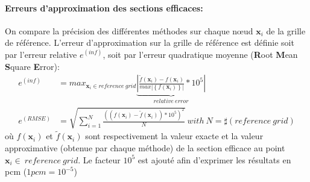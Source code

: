 \paragraph{Erreurs d'approximation des sections efficaces:\\}
\hspace{0.5cm} On compare la précision des différentes méthodes sur chaque nœud $\textbf{x}_i$ de la grille de référence.
L'erreur d'approximation sur la grille de référence est définie soit par l'erreur relative $e^{(inf)}$,
soit par l'erreur quadratique moyenne (\textbf{R}oot \textbf{M}ean \textbf{S}quare \textbf{E}rror):
\begin{align}
		e^{(inf)} & = max_{\textbf{x}_i \in reference\ grid} \underbrace{ \left | \frac{\tilde{f}(\textbf{x}_i) - f(\textbf{x}_i)}{ max \left | \left \{ f(\textbf{x}_i) \right \} \right |} * 10^5 \right | }_{relative\ error} \\
		e^{(RMSE)} & = \sqrt{ \sum_{i=1}^N \frac{((f(\textbf{x}_i) - \tilde{f}(\textbf{x}_i)) * 10^5)^2}{N} }\ with\ N = \sharp(reference\ grid)
\end{align}
où $f(\textbf{x}_i)$ et $\tilde{f}(\textbf{x}_i)$ sont respectivement la valeur exacte et la valeur approximative
(obtenue par chaque méthode) de la section efficace au point $\textbf{x}_i \in\ reference\ grid$. Le facteur $10^5$
est ajouté afin d'exprimer les résultats en pcm ($1pcm = 10^{-5}$)
